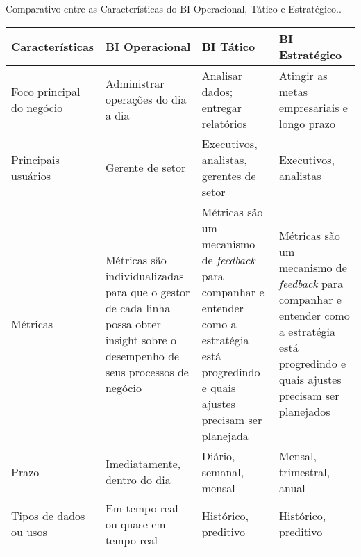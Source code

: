 \begin{quadro}[H]
	\begin{center}
		\caption{Comparativo entre as Características do BI Operacional, Tático e Estratégico..\label{qua:quadro-01}}
	    \begin{tabular}{ |p{3cm}|p{3cm}|p{3cm}|p{3cm}| }
			\hline
		    Características & 
            BI Operacional & 
            BI Tático & 
            BI Estratégico \\
		    \hline
            Foco principal do negócio &
            Administrar operações do dia a dia &
            Analisar dados; entregar relatórios & 
            Atingir as metas empresariais e longo prazo \\
            \hline
            Principais usuários &
            Gerente de setor &
            Executivos, analistas, gerentes de setor &
            Executivos, analistas \\
            \hline
            Métricas &
            Métricas são individualizadas 
            para que o gestor de cada linha
            possa obter insight sobre o
            desempenho de seus processos de negócio
            &
            Métricas são um mecanismo de \textit{feedback}
            para companhar e entender como a estratégia
            está progredindo e quais ajustes precisam ser planejada
            &
            Métricas são um mecanismo de \textit{feedback}
            para companhar e entender como a
            estratégia está progredindo e quais ajustes
            precisam ser planejados
            \\
            \hline
            Prazo &
            Imediatamente, dentro do dia &
            Diário, semanal, mensal&
            Mensal, trimestral, anual \\
            \hline
            Tipos de dados ou usos  &
            Em tempo real ou quase em tempo real  &
            Histórico, preditivo  &
            Histórico, preditivo \\
            \hline
    	\end{tabular}
	\end{center}
	\vspace*{-0,8cm}
	{\raggedright {}}
\end{quadro}
